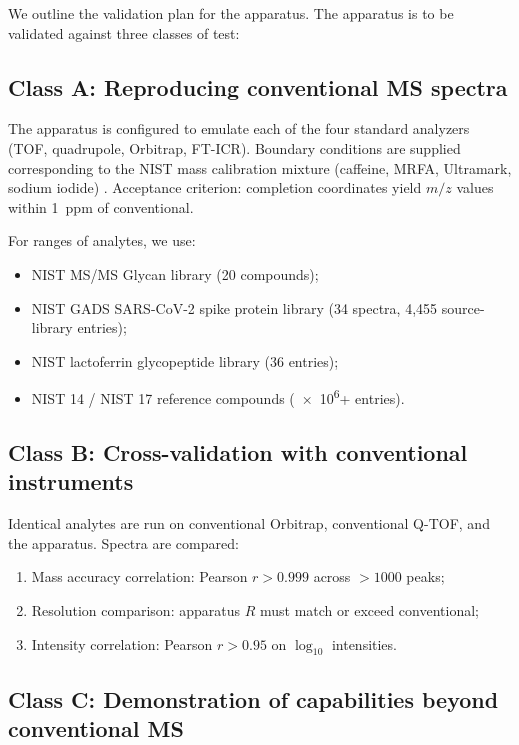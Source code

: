 \documentclass[twocolumn,11pt,a4paper]{article}
\theoremstyle{definition}
\theoremstyle{remark}
\begin{document}
We outline the validation plan for the apparatus. The apparatus is to be validated against three classes of test:

\subsection{Class A: Reproducing conventional MS spectra}

The apparatus is configured to emulate each of the four standard analyzers (TOF, quadrupole, Orbitrap, FT-ICR). Boundary conditions are supplied corresponding to the NIST mass calibration mixture (caffeine, MRFA, Ultramark, sodium iodide) \citep{nist2020srm1953,gross2017}. Acceptance criterion: completion coordinates yield $m/z$ values within \SI{1}{ppm} of conventional.

For ranges of analytes, we use:
\begin{itemize}[nosep]
    \item NIST MS/MS Glycan library (20 compounds);
    \item NIST GADS SARS-CoV-2 spike protein library (34 spectra, 4,455 source-library entries);
    \item NIST lactoferrin glycopeptide library (36 entries);
    \item NIST 14 / NIST 17 reference compounds (\num{e6}+ entries).
\end{itemize}

\subsection{Class B: Cross-validation with conventional instruments}

Identical analytes are run on conventional Orbitrap, conventional Q-TOF, and the apparatus. Spectra are compared:
\begin{enumerate}[nosep]
    \item Mass accuracy correlation: Pearson $r > 0.999$ across $> 1000$ peaks;
    \item Resolution comparison: apparatus $R$ must match or exceed conventional;
    \item Intensity correlation: Pearson $r > 0.95$ on $\log_{10}$ intensities.
\end{enumerate}

\subsection{Class C: Demonstration of capabilities beyond conventional MS}
\end{document}
